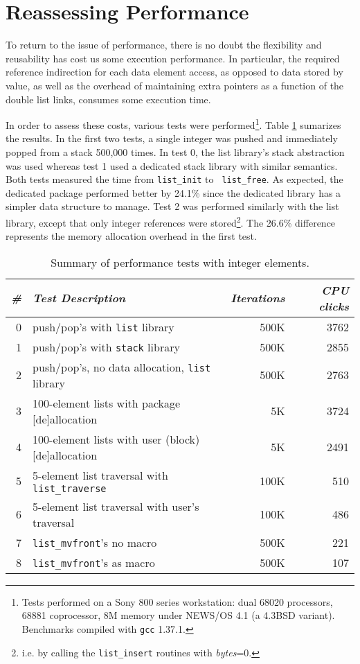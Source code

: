 \section{Reassessing Performance}
To return to the issue of performance, there is no doubt the flexibility and
reusability has cost us some execution performance.  In particular, the
required reference indirection for each data element access, as opposed to
data stored by value, as well as the overhead of maintaining extra pointers
as a function of the double list links, consumes some execution time.

In order to assess these costs, various tests were performed\footnote{Tests
performed on a Sony 800 series workstation: dual 68020 processors, 68881
coprocessor, 8M memory under NEWS/OS 4.1 (a 4.3BSD variant).  Benchmarks
compiled with {\tt gcc} 1.37.1.}.  Table \ref{performance} sumarizes the
results.  In the first two tests, a single integer was pushed and immediately
popped from a stack 500,000 times.  In test 0, the list library's stack
abstraction was used whereas test 1 used a dedicated stack library with
similar semantics.  Both tests measured the time from {\tt list\_init} to {\tt
list\_free}.  As expected, the dedicated package performed better by 24.1\%
since the dedicated library has a simpler data structure to manage.  Test 2
was performed similarly with the list library, except that only integer
references were stored\footnote{i.e.  by calling the {\tt list\_insert}
routines with {\em bytes}=0.}.  The 26.6\% difference represents the memory
allocation overhead in the first test.

\begin{table}[t]
\begin{center}
\begin{tabular}{|r|l|r|r|} \hline
{\em \#} & {\em Test Description} & {\em Iterations} & {\em CPU clicks} \\ 
	\hline \hline
0 & push/pop's with {\tt list} library                 & 500K & 3762 \\ \hline
1 & push/pop's with {\tt stack} library                & 500K & 2855 \\ \hline
2 & push/pop's, no data allocation, {\tt list} library & 500K & 2763 \\ \hline
3 & 100-element lists with package [de]allocation      &   5K & 3724 \\ \hline
4 & 100-element lists with user (block) [de]allocation &   5K & 2491 \\ \hline
5 & 5-element list traversal with {\tt list\_traverse} & 100K &  510 \\ \hline
6 & 5-element list traversal with user's traversal     & 100K &  486 \\ \hline
7 & {\tt list\_mvfront}'s no macro                     & 500K &  221 \\ \hline
8 & {\tt list\_mvfront}'s as macro                     & 500K &  107 \\ \hline
\end{tabular}
\caption{Summary of performance tests with integer elements.}
\label{performance}
\end{center}
\end{table}

